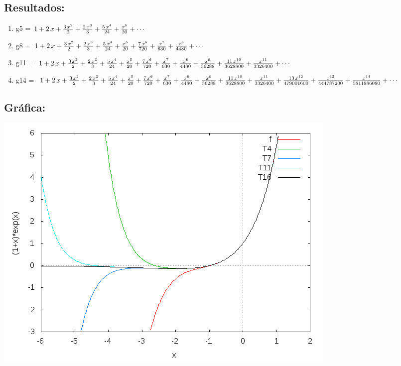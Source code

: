 \documentclass[10pt]{article}
\begin{document}
\subsection*{Resultados:}
\begin{enumerate}
\item g5 = $1+2\,x+{{3\,x^2}\over{2}}+{{2\,x^3}\over{3}}+{{5\,x^4}\over{24}}+{{
 x^5}\over{20}}+\cdots $
\item g8 = $1+2\,x+{{3\,x^2}\over{2}}+{{2\,x^3}\over{3}}+{{5\,x^4}\over{24}}+{{
 x^5}\over{20}}+{{7\,x^6}\over{720}}+{{x^7}\over{630}}+{{x^8}\over{
 4480}}+\cdots $
\item g11 = $1+2\,x+{{3\,x^2}\over{2}}+{{2\,x^3}\over{3}}+{{5\,x^4}\over{24}}+{{
 x^5}\over{20}}+{{7\,x^6}\over{720}}+{{x^7}\over{630}}+{{x^8}\over{
 4480}}+{{x^9}\over{36288}}+{{11\,x^{10}}\over{3628800}}+{{x^{11}
 }\over{3326400}}+\cdots $
\item g14 = $1+2\,x+{{3\,x^2}\over{2}}+{{2\,x^3}\over{3}}+{{5\,x^4}\over{24}}+{{
 x^5}\over{20}}+{{7\,x^6}\over{720}}+{{x^7}\over{630}}+{{x^8}\over{
 4480}}+{{x^9}\over{36288}}+{{11\,x^{10}}\over{3628800}}+{{x^{11}
 }\over{3326400}}+{{13\,x^{12}}\over{479001600}}+{{x^{13}}\over{
 444787200}}+{{x^{14}}\over{5811886080}}+\cdots $
\end{enumerate}
\subsection*{Gráfica:}
\includegraphics[scale=0.6]{plot5}
\end{document}
